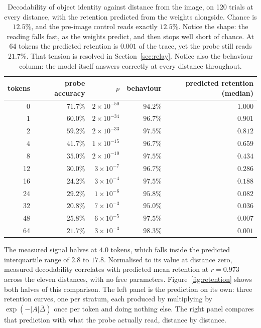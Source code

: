 \documentclass{article}
\begin{document}
\begin{table}[h]
\centering\small
\begin{tabular}{rrrrr}
\toprule
tokens & probe accuracy & $p$ & behaviour & predicted retention (median) \\
\midrule
0  & $71.7\%$ & $2\times10^{-50}$ & $94.2\%$ & $1.000$ \\
1  & $60.0\%$ & $2\times10^{-34}$ & $96.7\%$ & $0.901$ \\
2  & $59.2\%$ & $2\times10^{-33}$ & $97.5\%$ & $0.812$ \\
4  & $41.7\%$ & $1\times10^{-15}$ & $96.7\%$ & $0.659$ \\
8  & $35.0\%$ & $2\times10^{-10}$ & $97.5\%$ & $0.434$ \\
12 & $30.0\%$ & $3\times10^{-7}$  & $96.7\%$ & $0.286$ \\
16 & $24.2\%$ & $3\times10^{-4}$  & $97.5\%$ & $0.188$ \\
24 & $29.2\%$ & $1\times10^{-6}$  & $95.8\%$ & $0.082$ \\
32 & $20.8\%$ & $7\times10^{-3}$  & $95.0\%$ & $0.036$ \\
48 & $25.8\%$ & $6\times10^{-5}$  & $97.5\%$ & $0.007$ \\
64 & $21.7\%$ & $3\times10^{-3}$  & $98.3\%$ & $0.001$ \\
\bottomrule
\end{tabular}
\caption{Decodability of object identity against distance from the image, on
120 trials at every distance, with the retention predicted from the weights
alongside. Chance is $12.5\%$, and the pre-image control reads exactly
$12.5\%$. Notice the shape: the reading falls fast, as the weights predict,
and then stops well short of chance. At 64 tokens the predicted retention is
$0.001$ of the trace, yet the probe still reads $21.7\%$. That tension is
resolved in Section~\ref{sec:relay}. Notice also the behaviour column: the
model itself answers correctly at every distance throughout.}
\label{tab:fine}
\end{table}

The measured signal halves at $4.0$ tokens, which falls inside the predicted
interquartile range of $2.8$ to $17.8$. Normalised to its value at distance
zero, measured decodability correlates with predicted mean retention at
$r = 0.973$ across the eleven distances, with no free parameters.
Figure~\ref{fig:retention} shows both halves of this comparison. The left
panel is the prediction on its own: three retention curves, one per stratum,
each produced by multiplying by $\exp(-|A|\bar{\Delta})$ once per token and
doing nothing else. The right panel compares that prediction with what the
probe actually read, distance by distance.
\end{document}
